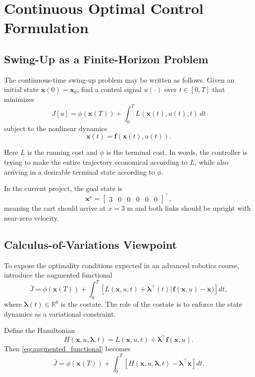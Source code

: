 \documentclass[conference]{IEEEtran}
\begin{document}
\section{Continuous Optimal Control Formulation}
\subsection{Swing-Up as a Finite-Horizon Problem}
The continuous-time swing-up problem may be written as follows. Given an initial state $\bm{x}(0)=\bm{x}_0$, find a control signal $u(\cdot)$ over $t\in[0,T]$ that minimizes
\begin{equation}
J[u] = \phi(\bm{x}(T)) + \int_{0}^{T} L(\bm{x}(t),u(t),t)\,dt
\label{eq:continuous_cost}
\end{equation}
subject to the nonlinear dynamics
\begin{equation}
\dot{\bm{x}}(t) = \bm{f}(\bm{x}(t),u(t)).
\label{eq:continuous_dynamics}
\end{equation}

Here $L$ is the running cost and $\phi$ is the terminal cost. In words, the controller is trying to make the entire trajectory economical according to $L$, while also arriving in a desirable terminal state according to $\phi$.

In the current project, the goal state is
\begin{equation}
\bm{x}^{\star} =
\begin{bmatrix}
3 & 0 & 0 & 0 & 0 & 0
\end{bmatrix}^{\top},
\end{equation}
meaning the cart should arrive at $x=3$ m and both links should be upright with near-zero velocity.

\subsection{Calculus-of-Variations Viewpoint}
To expose the optimality conditions expected in an advanced robotics course, introduce the augmented functional
\begin{equation}
\bar{J}
=
\phi(\bm{x}(T))
+
\int_0^T
\left[
L(\bm{x},u,t)
+
\bm{\lambda}^{\top}(t)\big(\bm{f}(\bm{x},u)-\dot{\bm{x}}\big)
\right] dt,
\label{eq:augmented_functional}
\end{equation}
where $\bm{\lambda}(t)\in\mathbb{R}^6$ is the costate. The role of the costate is to enforce the state dynamics as a variational constraint.

Define the Hamiltonian
\begin{equation}
H(\bm{x},u,\bm{\lambda},t)
=
L(\bm{x},u,t)+\bm{\lambda}^{\top}\bm{f}(\bm{x},u).
\label{eq:hamiltonian}
\end{equation}
Then \eqref{eq:augmented_functional} becomes
\begin{equation}
\bar{J}
=
\phi(\bm{x}(T))
+
\int_0^T
\left[
H(\bm{x},u,\bm{\lambda},t)
-\bm{\lambda}^{\top}\dot{\bm{x}}
\right] dt.
\end{equation}
\end{document}
